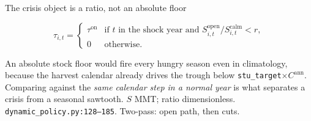 \begin{frame}{The crisis object is a ratio, not an absolute floor}

\[
\tau_{i,t}
=
\begin{cases}
\tau^{\mathrm{on}} & \text{if } t\text{ in the shock year and }
S^{\mathrm{open}}_{i,t}/S^{\mathrm{calm}}_{i,t} < r,\\
0 & \text{otherwise.}
\end{cases}
\]

An absolute stock floor would fire every hungry season even in
climatology, because the harvest calendar already drives the trough below
\texttt{stu\_target}$\times C^{\mathrm{ann}}$. Comparing against the
\emph{same calendar step in a normal year} is what separates a crisis from
a seasonal sawtooth.
{$S$ MMT; ratio dimensionless.}
{\texttt{dynamic\_policy.py:128--185}. Two-pass: open path, then cuts.}
\end{frame}

